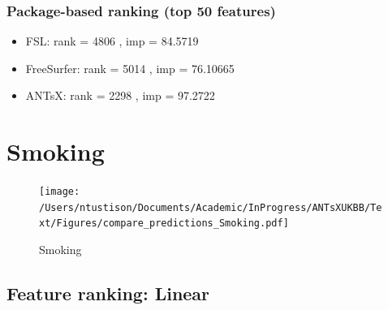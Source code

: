 \documentclass[
  10pt,
]{article}
\begin{document}
\hypertarget{package-based-ranking-top-50-features-9}{%
\subsubsection{Package-based ranking (top 50
features)}\label{package-based-ranking-top-50-features-9}}

\begin{itemize}
\item
  FSL: rank = 4806 , imp = 84.5719
\item
  FreeSurfer: rank = 5014 , imp = 76.10665
\item
  ANTsX: rank = 2298 , imp = 97.2722
\end{itemize}

\clearpage

\hypertarget{smoking}{%
\section{Smoking}\label{smoking}}

\begin{figure}
\centering
\texttt{[image: /Users/ntustison/Documents/Academic/InProgress/ANTsXUKBB/Text/Figures/compare\_predictions\_Smoking.pdf]}
\caption{Smoking}
\end{figure}

\hypertarget{feature-ranking-linear-10}{%
\subsection{Feature ranking: Linear}\label{feature-ranking-linear-10}}
\end{document}
